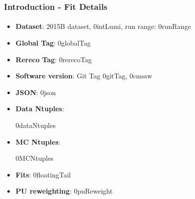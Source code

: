 
\begin{frame}
\frametitle{Introduction - Fit Details}
\framesubtitle{\invMassVarName}

\vspace{10mm}


\begin{itemize}
\item \textbf{Dataset}: 2015B dataset, 0intLumi, run range: 0runRange
\item \textbf{Global Tag}: 0globalTag
\item \textbf{Rereco Tag}: 0rerecoTag
\item \textbf{Software version}: Git Tag 0gitTag, 0cmssw
\item \textbf{JSON}: 0json
\item \textbf{Data Ntuples}: \\
\begin{ lstlisting}  
{\tiny 0dataNtuples }
\end{ lstlisting}
\item \textbf{MC Ntuples}: \\
\begin{ lstlisting} 
{\tiny 0MCNtuples }
\end{ lstlisting}
\item \textbf{Fits}: 0floatingTail
\item \textbf{PU reweighting}: 0puReweight


\end{itemize}

\end{frame}








